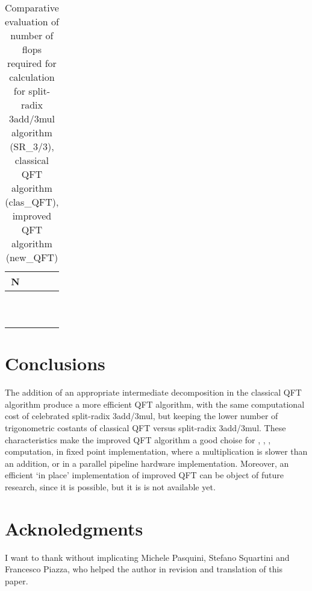 \documentclass[a4paper,10pt]{article}
\begin{document}
\begin{table}[tb]
\caption{Comparative evaluation of number of flops required for  calculation for split-radix 3add/3mul algorithm (SR\_3/3), classical QFT algorithm 
(clas\_QFT), improved QFT algorithm (new\_QFT)}
\label{tab:compara_flop}
\centering
\scalebox{0.7}
{
\begin{tabular}{cccc}
\toprule
N &  &  &  \\
\midrule
 &  &  &  \\
 &  &   &  \\
 &  &  &  \\
 &  &   &  \\
 &  &   &  \\
 &  &  &   \\
 &  &  &  \\
 &  &  &  \\
 &  &  &  \\
 &  &  &  \\
\bottomrule
\end{tabular}
}
\end{table}










\section{Conclusions} \label{sec:finale}

The addition of an appropriate intermediate decomposition in the classical QFT algorithm produce a more efficient QFT algorithm, with the same
computational cost of celebrated split-radix 3add/3mul, but keeping the lower number of trigonometric costants of classical QFT versus split-radix 3add/3mul.
These characteristics make the improved QFT algorithm a good choise for , , ,  computation, in fixed point implementation, where a multiplication is slower than an addition, or in a parallel pipeline hardware implementation.
Moreover, an efficient `in place' implementation of improved QFT can be object of future research, since it is possible, but it is is not available yet.





\section{Acknoledgments}

I want to thank without implicating Michele Pasquini, Stefano Squartini and Francesco Piazza, who helped the author in revision and translation of this paper.
\end{document}
